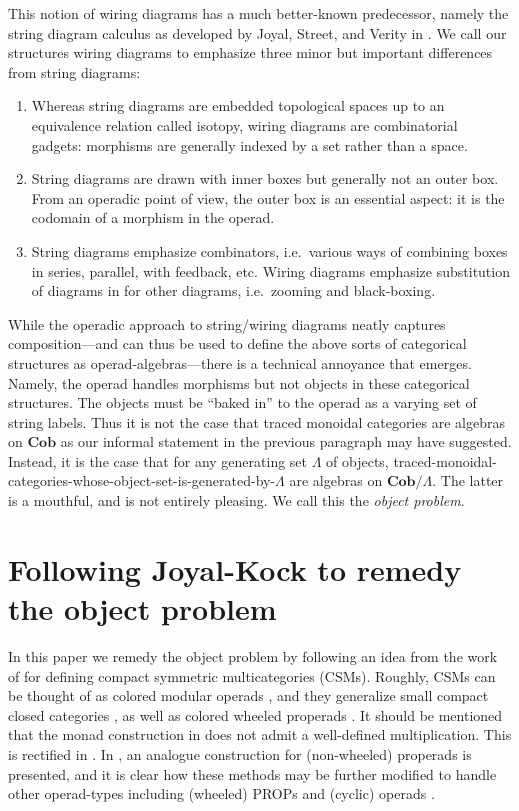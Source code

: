\documentclass[11pt, article, oneside]{memoir}
\theoremstyle{plain}
\theoremstyle{definition}
\theoremstyle{remark}
\newcommand{\Cat}[1]{\mathbf{#1}}
\newcommand{\Cob}{\Cat{Cob}}
\begin{document}
This notion of wiring diagrams has a much better-known predecessor, namely the string diagram calculus as developed by Joyal, Street, and Verity in \cite{Joyal.Street:1993a, Joyal.Street.Verity:1996a}. We call our structures wiring diagrams to emphasize three minor but important differences from string diagrams:
\begin{enumerate}
	\item Whereas string diagrams are embedded topological spaces up to an equivalence relation called isotopy, wiring diagrams are combinatorial gadgets: morphisms are generally indexed by a set rather than a space.
	\item String diagrams are drawn with inner boxes but generally not an outer box. From an operadic point of view, the outer box is an essential aspect: it is the codomain of a morphism in the operad.
	\item String diagrams emphasize combinators, i.e.\ various ways of combining boxes in series, parallel, with feedback, etc. Wiring diagrams emphasize substitution of diagrams in for other diagrams, i.e.\ zooming and black-boxing.
\end{enumerate}

While the operadic approach to string/wiring diagrams neatly captures composition---and can thus be used to define the above sorts of categorical structures as operad-algebras---there is a technical annoyance that emerges. Namely, the operad handles morphisms but not objects in these categorical structures. The objects must be ``baked in'' to the operad as a varying set of string labels. Thus it is not the case that traced monoidal categories are algebras on $\Cob$ as our informal statement in the previous paragraph may have suggested. Instead, it is the case that for any generating set $\Lambda$ of objects, traced-monoidal-categories-whose-object-set-is-generated-by-$\Lambda$ are algebras on $\Cob/\Lambda$. The latter is a mouthful, and is not entirely pleasing. We call this the \emph{object problem}.

\section{Following Joyal-Kock to remedy the object problem}\label{sec.JK_remedy}

In this paper we remedy the object problem by following an idea from the work of \cite{Joyal.Kock} for defining compact symmetric multicategories (CSMs). Roughly, CSMs can be thought of as colored modular operads \cite{}, and they generalize small compact closed categories \cite{}, as well as colored wheeled properads \cite{}. It should be mentioned that the monad construction in \cite{Joyal.Kock} does not admit a well-defined multiplication. This is rectified in \cite{Raynor:2018a}. In \cite{}, an analogue construction for (non-wheeled) properads is presented, and it is clear how these methods may be further modified to handle other operad-types including (wheeled) PROPs \cite{} and (cyclic) operads \cite{}. 
\end{document}
